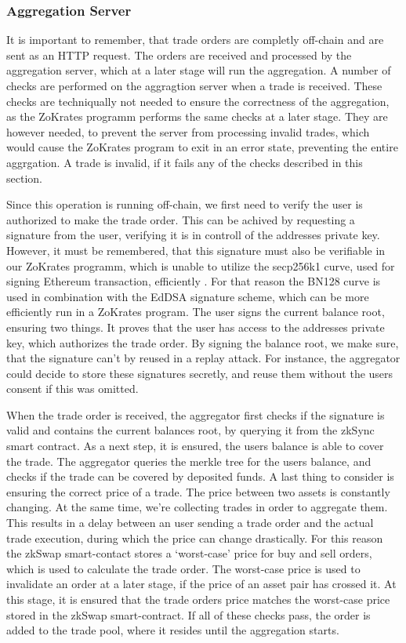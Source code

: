 \documentclass[../../thesis.tex]{subfiles}
\begin{document}
\subsubsection{Aggregation Server}
It is important to remember, that trade orders are completly off-chain and are sent as an HTTP request. The orders are received and processed by the aggregation server, which at a later stage will run the aggregation. A number of checks are performed on the aggragtion server when a trade is received. These checks are techniqually not needed to ensure the correctness of the aggregation, as the ZoKrates programm performs the same checks at a later stage. They are however needed, to prevent the server from processing invalid trades, which would cause the ZoKrates program to exit in an error state, preventing the entire aggrgation. A trade is invalid, if it fails any of the checks described in this section.

Since this operation is running off-chain, we first need to verify the user is authorized to make the trade order. This can be achived by requesting a signature from the user, verifying it is in controll of the addresses private key. However, it must be remembered, that this signature must also be verifiable in our ZoKrates programm, which is unable to utilize the secp256k1 curve, used for signing Ethereum transaction, efficiently \cite{deml_2019}. For that reason the BN128 curve is used in combination with the EdDSA signature scheme, which can be more efficiently run in a ZoKrates program. The user signs the current balance root, ensuring two things. It proves that the user has access to the addresses private key, which authorizes the trade order. By signing the balance root, we make sure, that the signature can't by reused in a replay attack. For instance, the aggregator could decide to store these signatures secretly, and reuse them without the users consent if this was omitted. 

When the trade order is received, the aggregator first checks if the signature is valid and contains the current balances root, by querying it from the zkSync smart contract. As a next step, it is ensured, the users balance is able to cover the trade. The aggregator queries the merkle tree for the users balance, and checks if the trade can be covered by deposited funds. A last thing to consider is ensuring the correct price of a trade. The price between two assets is constantly changing. At the same time, we're collecting trades in order to aggregate them. This results in a delay between an user sending a trade order and the actual trade execution, during which the price can change drastically. For this reason the zkSwap smart-contact stores a `worst-case' price for buy and sell orders, which is used to calculate the trade order. The worst-case price is used to invalidate an order at a later stage, if the price of an asset pair has crossed it. At this stage, it is ensured that the trade orders price matches the worst-case price stored in the zkSwap smart-contract. If all of these checks pass, the order is added to the trade pool, where it resides until the aggregation starts.  
\end{document}
